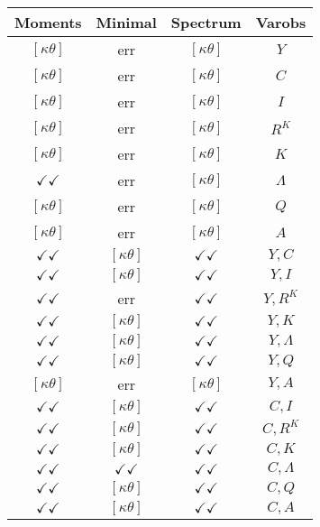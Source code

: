 \documentclass[a4paper,10pt]{article}
\begin{document}
\centering
\begin{longtable}{|c|c|c|c|}
\hline
Moments & Minimal & Spectrum & Varobs \\
\hline
$[\kappa \theta ]$ & err & $[\kappa \theta ]$ & ${Y}$ \\
\hline
$[\kappa \theta ]$ & err & $[\kappa \theta ]$ & ${C}$ \\
\hline
$[\kappa \theta ]$ & err & $[\kappa \theta ]$ & ${I}$ \\
\hline
$[\kappa \theta ]$ & err & $[\kappa \theta ]$ & ${R^{K}}$ \\
\hline
$[\kappa \theta ]$ & err & $[\kappa \theta ]$ & ${K}$ \\
\hline
$\checkmark\checkmark$ & err & $[\kappa \theta ]$ & ${\Lambda}$ \\
\hline
$[\kappa \theta ]$ & err & $[\kappa \theta ]$ & ${Q}$ \\
\hline
$[\kappa \theta ]$ & err & $[\kappa \theta ]$ & ${A}$ \\
\hline
$\checkmark\checkmark$ & $[\kappa \theta ]$ & $\checkmark\checkmark$ & ${Y},{C}$ \\
\hline
$\checkmark\checkmark$ & $[\kappa \theta ]$ & $\checkmark\checkmark$ & ${Y},{I}$ \\
\hline
$\checkmark\checkmark$ & err & $\checkmark\checkmark$ & ${Y},{R^{K}}$ \\
\hline
$\checkmark\checkmark$ & $[\kappa \theta ]$ & $\checkmark\checkmark$ & ${Y},{K}$ \\
\hline
$\checkmark\checkmark$ & $[\kappa \theta ]$ & $\checkmark\checkmark$ & ${Y},{\Lambda}$ \\
\hline
$\checkmark\checkmark$ & $[\kappa \theta ]$ & $\checkmark\checkmark$ & ${Y},{Q}$ \\
\hline
$[\kappa \theta ]$ & err & $[\kappa \theta ]$ & ${Y},{A}$ \\
\hline
$\checkmark\checkmark$ & $[\kappa \theta ]$ & $\checkmark\checkmark$ & ${C},{I}$ \\
\hline
$\checkmark\checkmark$ & $[\kappa \theta ]$ & $\checkmark\checkmark$ & ${C},{R^{K}}$ \\
\hline
$\checkmark\checkmark$ & $[\kappa \theta ]$ & $\checkmark\checkmark$ & ${C},{K}$ \\
\hline
$\checkmark\checkmark$ & $\checkmark\checkmark$ & $\checkmark\checkmark$ & ${C},{\Lambda}$ \\
\hline
$\checkmark\checkmark$ & $[\kappa \theta ]$ & $\checkmark\checkmark$ & ${C},{Q}$ \\
\hline
$\checkmark\checkmark$ & $[\kappa \theta ]$ & $\checkmark\checkmark$ & ${C},{A}$ \\

\end{longtable}
\end{document}

